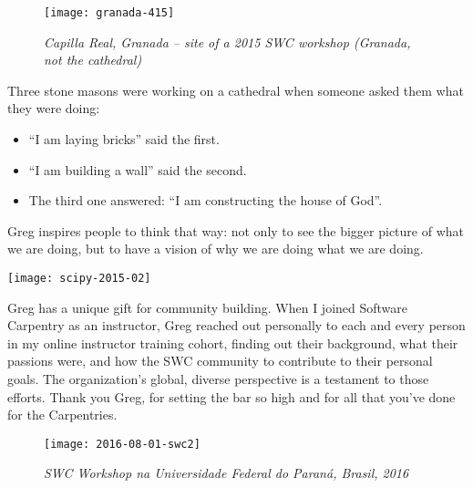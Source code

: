 
\newpage
\vspace*{\fill}

\begin{figure}[h!]
\begin{center}
\texttt{[image: granada-415]}
    \caption*{\textit{Capilla Real, Granada -- site of a 2015 SWC workshop (Granada, not the cathedral)}}
\end{center}
\end{figure}

Three stone masons were working on a cathedral when someone asked them what
they were doing:

\begin{itemize}
\item ``I am laying bricks'' said the first.
\item ``I am building a wall'' said the second.
\item The third one answered: ``I am constructing the house of God''.
\end{itemize}

Greg inspires people to think that way: not only to see the bigger picture of
what we are doing, but to have a vision of why we are doing what we are doing.

\vspace*{\fill}

\newpage
\vspace*{\fill}
\begin{center}
    \texttt{[image: scipy-2015-02]}
\end{center}

Greg has a unique gift for community building. When I joined Software Carpentry
as an instructor, Greg reached out personally to each and every person in my
online instructor training cohort, finding out their background, what their
passions were, and how the SWC community to contribute to their personal goals.
The organization's global, diverse perspective is a testament to those efforts.
Thank you Greg, for setting the bar so high and for all that you've done for
the Carpentries.


\vspace*{\fill}
\newpage

\begin{figure}[h!]
\begin{center}
\texttt{[image: 2016-08-01-swc2]}
\caption*{\textit{SWC Workshop na Universidade Federal do Paraná, Brasil, 2016}}
\end{center}
\end{figure}

